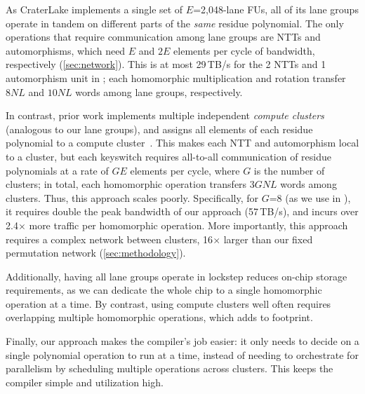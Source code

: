 As CraterLake implements a single set of $E$=2,048-lane FUs, all of its lane
groups operate in tandem on different parts of the \emph{same} residue
polynomial. The only operations that require communication among lane groups
are NTTs and automorphisms, which need $E$ and $2E$ elements per cycle of
bandwidth, respectively (\autoref{sec:network}). This is at most 29\,TB/s for
the 2 NTTs and 1 automorphism unit in \name; each homomorphic multiplication
and rotation transfer $8NL$ and $10NL$ words among lane groups, respectively.

In contrast, prior work implements multiple independent \emph{compute clusters}
(analogous to our lane groups), and assigns all elements of each residue
polynomial to a compute cluster~\cite{riazi:asplos20:heax,feldmann:micro21:f1}.
This makes each NTT and automorphism local to a cluster, but each keyswitch
requires all-to-all communication of residue polynomials at a rate of $GE$
elements per cycle, where $G$ is the number of clusters; in total, each
homomorphic operation transfers $3GNL$ words among clusters. Thus, this
approach scales poorly. Specifically, for $G$=8 (as we use in \name), it
requires double the peak bandwidth of our approach (57\,TB/s), and incurs over
2.4$\times$ more traffic per homomorphic operation. More importantly, this
approach requires a complex network between clusters, 16$\times$ larger than
our fixed permutation network (\autoref{sec:methodology}).

Additionally, having all lane groups operate in lockstep reduces on-chip
storage requirements, as we can dedicate the whole chip to a single homomorphic
operation at a time. By contrast, using compute clusters well often requires
overlapping multiple homomorphic operations, which adds to footprint.

Finally, our approach makes the compiler's job easier: it only needs to decide
on a single polynomial operation to run at a time, instead of needing to
orchestrate for parallelism by scheduling multiple operations across clusters.
This keeps the compiler simple and utilization high.

